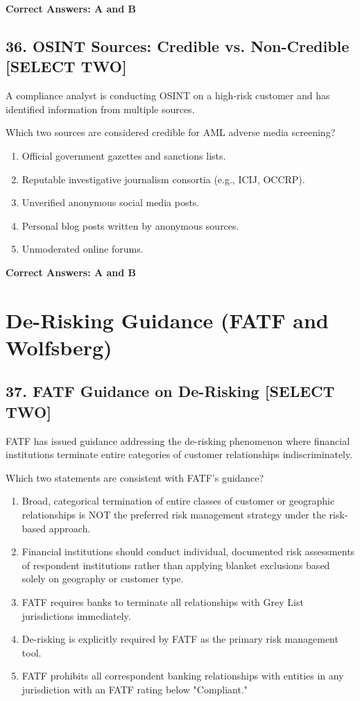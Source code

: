 \documentclass[11pt,a4paper]{article}
\begin{document}
	\textbf{Correct Answers: A and B}
	
	\subsection{36. OSINT Sources: Credible vs. Non-Credible \textnormal{[SELECT TWO]}}
	
	A compliance analyst is conducting OSINT on a high-risk customer and has identified information from multiple sources.
	
	Which two sources are considered credible for AML adverse media screening?
	
	\begin{enumerate}[label=\Alph*.]
		\item Official government gazettes and sanctions lists.
		\item Reputable investigative journalism consortia (e.g., ICIJ, OCCRP).
		\item Unverified anonymous social media posts.
		\item Personal blog posts written by anonymous sources.
		\item Unmoderated online forums.
	\end{enumerate}
	
	\textbf{Correct Answers: A and B}
	
	\section{De-Risking Guidance (FATF and Wolfsberg)}
	
	\subsection{37. FATF Guidance on De-Risking \textnormal{[SELECT TWO]}}
	
	FATF has issued guidance addressing the de-risking phenomenon where financial institutions terminate entire categories of customer relationships indiscriminately.
	
	Which two statements are consistent with FATF's guidance?
	
	\begin{enumerate}[label=\Alph*.]
		\item Broad, categorical termination of entire classes of customer or geographic relationships is NOT the preferred risk management strategy under the risk-based approach.
		\item Financial institutions should conduct individual, documented risk assessments of respondent institutions rather than applying blanket exclusions based solely on geography or customer type.
		\item FATF requires banks to terminate all relationships with Grey List jurisdictions immediately.
		\item De-risking is explicitly required by FATF as the primary risk management tool.
		\item FATF prohibits all correspondent banking relationships with entities in any jurisdiction with an FATF rating below "Compliant."
	\end{enumerate}
	
\end{document}

